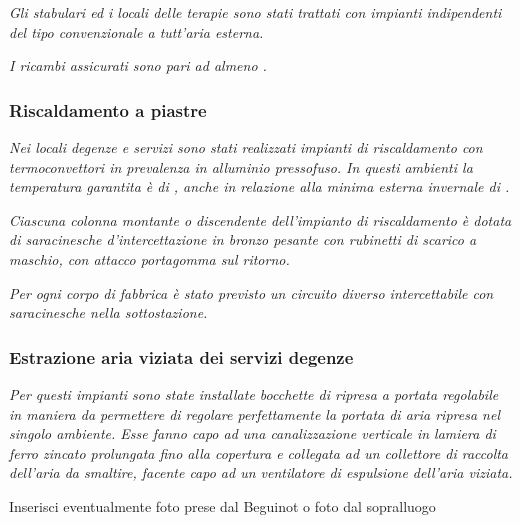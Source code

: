 \begin{quoting}
	\emph{Gli stabulari ed i locali delle terapie sono stati trattati con impianti indipendenti del tipo convenzionale a tutt'aria esterna.}
	
	\emph{I ricambi assicurati sono pari ad almeno .}
	
	\sdots
	\subsubsection{Riscaldamento a piastre}
	\emph{Nei locali degenze e servizi sono stati realizzati impianti di riscaldamento con termoconvettori in prevalenza in alluminio pressofuso. In questi ambienti la temperatura garantita è di , anche in relazione alla minima esterna invernale di .}
	
	\sdots
	
	\emph{Ciascuna colonna montante o discendente dell'impianto di riscaldamento è dotata di saracinesche d'intercettazione in bronzo pesante con rubinetti di scarico a maschio, con attacco portagomma sul ritorno.}
	
	\emph{Per ogni corpo di fabbrica è stato previsto un circuito diverso intercettabile con saracinesche nella sottostazione.}
	\subsubsection{Estrazione aria viziata dei servizi degenze}
	\emph{Per questi impianti sono state installate bocchette di ripresa a portata regolabile in maniera da permettere di regolare perfettamente la portata di aria ripresa nel singolo ambiente. Esse fanno capo ad una canalizzazione verticale in lamiera di ferro zincato prolungata fino alla copertura e collegata ad un collettore di raccolta dell'aria da smaltire, facente capo ad un ventilatore di espulsione dell'aria viziata.}
\end{quoting}

Inserisci eventualmente foto prese dal Beguinot o foto dal sopralluogo

